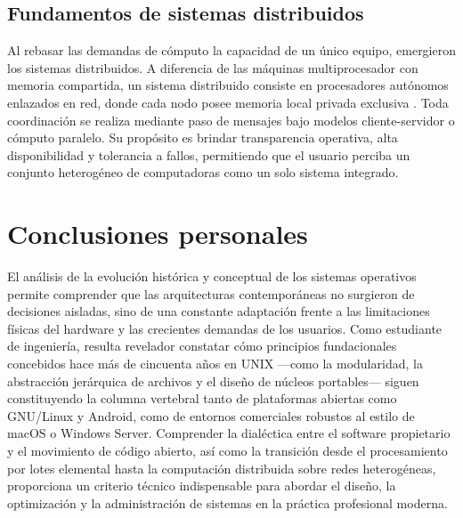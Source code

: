 \documentclass[12pt]{article}
\begin{document}
\subsection*{Fundamentos de sistemas distribuidos}

Al rebasar las demandas de cómputo la capacidad de un único equipo, emergieron los sistemas distribuidos. A diferencia de las máquinas multiprocesador con memoria compartida, un sistema distribuido consiste en procesadores autónomos enlazados en red, donde cada nodo posee memoria local privada exclusiva \parencite[plantillas 49--50]{mercado2026tema1}. Toda coordinación se realiza mediante paso de mensajes bajo modelos cliente-servidor o cómputo paralelo. Su propósito es brindar transparencia operativa, alta disponibilidad y tolerancia a fallos, permitiendo que el usuario perciba un conjunto heterogéneo de computadoras como un solo sistema integrado.

\section{Conclusiones personales}
\label{sec:conclusionesPersonales}

El análisis de la evolución histórica y conceptual de los sistemas operativos permite comprender que las arquitecturas contemporáneas no surgieron de decisiones aisladas, sino de una constante adaptación frente a las limitaciones físicas del hardware y las crecientes demandas de los usuarios. Como estudiante de ingeniería, resulta revelador constatar cómo principios fundacionales concebidos hace más de cincuenta años en UNIX —como la modularidad, la abstracción jerárquica de archivos y el diseño de núcleos portables— siguen constituyendo la columna vertebral tanto de plataformas abiertas como GNU/Linux y Android, como de entornos comerciales robustos al estilo de macOS o Windows Server. Comprender la dialéctica entre el software propietario y el movimiento de código abierto, así como la transición desde el procesamiento por lotes elemental hasta la computación distribuida sobre redes heterogéneas, proporciona un criterio técnico indispensable para abordar el diseño, la optimización y la administración de sistemas en la práctica profesional moderna.

\nocite{*}
\printbibliography[heading=bibintoc, title={Referencias}]
\end{document}
